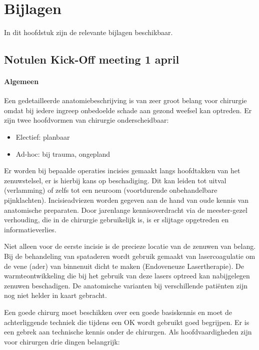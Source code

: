 \section{Bijlagen}

In dit hoofdstuk zijn de relevante bijlagen beschikbaar. 

\subsection{Notulen Kick-Off meeting 1 april}
\label{notulen}
\paragraph{Algemeen}

Een gedetailleerde anatomiebeschrijving is van zeer groot belang voor chirurgie omdat bij iedere ingreep onbedoelde schade aan gezond weefsel kan optreden. Er zijn twee hoofdvormen van chirurgie onderscheidbaar: 

\begin{itemize}
	\item Electief: planbaar 
	\item Ad-hoc: bij trauma, ongepland 
\end{itemize}

Er worden bij bepaalde operaties incisies gemaakt langs hoofdtakken van het zenuwstelsel, er is hierbij kans op beschadiging. Dit kan leiden tot uitval (verlamming) of zelfs tot een neuroom (voortdurende onbehandelbare pijnklachten). Incisieadviezen worden gegeven aan de hand van oude kennis van anatomische preparaten. Door jarenlange kennisoverdracht via de meester-gezel verhouding, die in de chirurgie gebruikelijk is, is er slijtage opgetreden en informatieverlies. 

Niet alleen voor de eerste incisie is de precieze locatie van de zenuwen van belang. Bij de behandeling van spataderen wordt gebruik gemaakt van lasercoagulatie om de vene (ader) van binnenuit dicht te maken (Endoveneuze Lasertherapie). De warmteontwikkeling die bij het gebruik van deze lasers optreed kan nabijgelegen zenuwen beschadigen. De anatomische varianten bij verschillende pati\"enten zijn nog niet helder in kaart gebracht. 

Een goede chirurg moet beschikken over een goede basiskennis en moet de achterliggende techniek die tijdens een OK wordt gebruikt goed begrijpen.
Er is een gebrek aan technische kennis onder de chirurgen.
Als hoofdvaardigheden zijn voor chirurgen drie dingen belangrijk:

